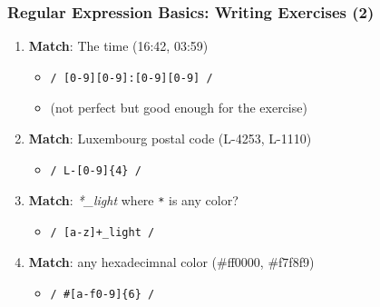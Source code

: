 \documentclass{beamer}
\begin{document}
\begin{frame}[fragile]
    \frametitle{Regular Expression Basics: Writing Exercises (2)}
    \begin{enumerate}
        \item \textbf{Match}: The time (16:42, 03:59)
        \pause
        \begin{itemize}
            \item[] \begin{verbatim}/ [0-9][0-9]:[0-9][0-9] /\end{verbatim}
            \item[] (not perfect but good enough for the exercise)
        \end{itemize}
        \item \textbf{Match}: Luxembourg postal code (L-4253, L-1110)
        \pause
        \begin{itemize}
            \item[] \begin{verbatim}/ L-[0-9]{4} /\end{verbatim}
        \end{itemize}
        \item \textbf{Match}: \textit{*\_light} where \texttt{*} is any color?
        \pause
        \begin{itemize}
            \item[] \begin{verbatim}/ [a-z]+_light /\end{verbatim}
        \end{itemize}
        \item \textbf{Match}: any hexadecimnal color (\#ff0000, \#f7f8f9)
        \pause
        \begin{itemize}
            \item[] \begin{verbatim}/ #[a-f0-9]{6} /\end{verbatim}
        \end{itemize}
    \end{enumerate}
\end{frame}
\end{document}
